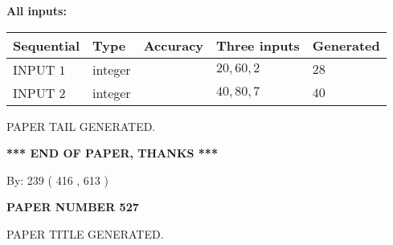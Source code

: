 \documentclass{ctexart}
\begin{document}
   
   
   
\noindent\vspace{0.1in}\hspace{-0.08in} {\textbf{\Large{All inputs: }}}
   
   
  
  
\noindent\begin{tabular}{|l|l|l|l|l|}
\hline
 Sequential & Type & Accuracy & Three inputs & Generated \\ 
\hline
 
 
  INPUT $  1 $ & integer &  & $
 20
 , 
 60
 , 
 2
 $ & $ 28 $ 
 \\  \hline  
 
 
  INPUT $  2 $ & integer &  & $
 40
 , 
 80
 , 
 7
 $ & $ 40 $ 
 \\  \hline  
 \end{tabular}
   
   
   
   
   
   
 \vspace{0.2in}
 
   
   
\vspace{2.0in} PAPER TAIL GENERATED.
   
   
   
   
\vspace{1.0in} 
{\textbf{\large{ *** END OF PAPER, THANKS *** }}} 
   
   
\hspace{1.0in} By: 
 239 ( 416 ,  613 )
   
   
   
   
\newpage 
\setcounter{page}{ 
   527001 } 
   
   
   
   
 {\textbf{ \Large{ PAPER NUMBER  527  }}}
   
   
\vspace{0.2in}
   
   
   
   
   
   
   
   
 \vspace{0.2in}
 
 
 
 
   
   
 PAPER TITLE GENERATED.
   
   
   
\vspace{0.2in}
   
\end{document}
